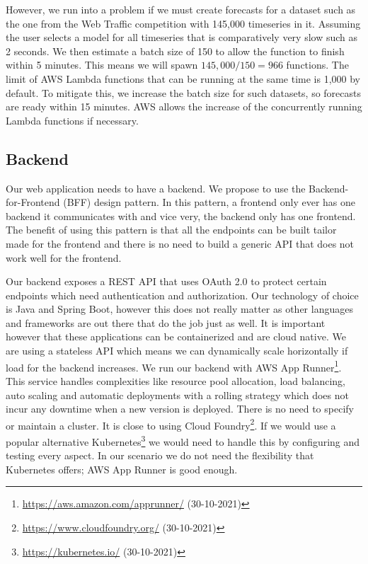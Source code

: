 However, we run into a problem if we must create forecasts for a dataset such as the one from the Web Traffic competition with 145,000 timeseries in it. Assuming the user selects a model for all timeseries that is comparatively very slow such as 2 seconds. We then estimate a batch size of 150 to allow the function to finish within 5 minutes. This means we will spawn $145,000 / 150 = 966$ functions. The limit of AWS Lambda functions that can be running at the same time is 1,000 by default. To mitigate this, we increase the batch size for such datasets, so forecasts are ready within 15 minutes. AWS allows the increase of the concurrently running Lambda functions if necessary.

\subsection{Backend}

Our web application needs to have a backend. We propose to use the Backend-for-Frontend (BFF) design pattern. In this pattern, a frontend only ever has one backend it communicates with and vice very, the backend only has one frontend. The benefit of using this pattern is that all the endpoints can be built tailor made for the frontend and there is no need to build a generic API that does not work well for the frontend.

Our backend exposes a REST API that uses OAuth 2.0 \cite{oauth2} to protect certain endpoints which need authentication and authorization. Our technology of choice is Java and Spring Boot, however this does not really matter as other languages and frameworks are out there that do the job just as well. It is important however that these applications can be containerized and are cloud native. We are using a stateless API which means we can dynamically scale horizontally if load for the backend increases. We run our backend with AWS App Runner\footnote{\url{https://aws.amazon.com/apprunner/} (30-10-2021)}. This service handles complexities like resource pool allocation, load balancing, auto scaling and automatic deployments with a rolling strategy which does not incur any downtime when a new version is deployed. There is no need to specify or maintain a cluster. It is close to using Cloud Foundry\footnote{\url{https://www.cloudfoundry.org/} (30-10-2021)}. If we would use a popular alternative Kubernetes\footnote{\url{https://kubernetes.io/} (30-10-2021)} we would need to handle this by configuring and testing every aspect. In our scenario we do not need the flexibility that Kubernetes offers; AWS App Runner is good enough.

